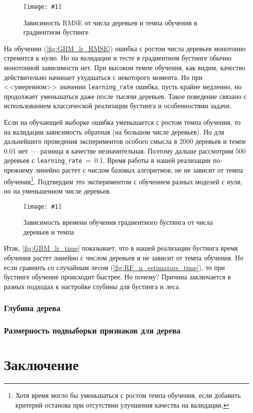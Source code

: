 \documentclass[12pt]{article}
\newcommand{\mpl}[2]{
    \begin{figure}[!h]
        \texttt{[image: \#1]}
        \centering
        \caption{#2}
        \label{fig:#1}
     \end{figure}
}
\begin{document}
\mpl{GBM_lr_RMSE}{Зависимость RMSE от числа деревьев и темпа обучения в градиентном бустинге}

На обучении (\autoref{fig:GBM_lr_RMSE}) ошибка с ростом числа деревьев монотонно стремится к нулю. Но на валидации и тесте в градиентном бустинге обычно монотонной зависимости нет. При высоком темпе обучения, как видим, качество действительно начинает ухудшаться с некоторого момента. Но при <<умеренном>> значении \verb|learning_rate| ошибка, пусть крайне медленно, но продолжает уменьшаться даже после тысячи деревьев. Такое поведение связано с использованием классической реализации бустинга и особенностями задачи. 

Если на обучающей выборке ошибка уменьшается с ростом темпа обучения, то на валидации зависимость обратная (на большом числе деревьев). Но для дальнейшего проведения экспериментов особого смысла в 2000 деревьев и темпе 0.01 нет~--- разница в качестве незначительная. Поэтому дальше рассмотрим 500 деревьев с \verb|learning_rate|~=~0.1. Время работы в нашей реализации по-прежнему линейно растет с числом базовых алгоритмов, не не зависит от темпа обучения\footnote{Хотя время могло бы уменьшаться с ростом темпа обучения, если добавить критерий останова при отсутствии улучшения качества на валидации.}. Подтвердим это экспериментом с обучением разных моделей с нуля, но на уменьшенном числе деревьев.

\mpl{GBM_lr_time}{Зависимость времени обучения градиентного бустинга от числа деревьев и темпа}

Итак, \autoref{fig:GBM_lr_time} показывает, что в нашей реализации бустинга время обучения растет линейно с числом деревьев и не зависит от темпа обучения. Но если сравнить со случайным лесом (\autoref{fig:RF_n_estimators_time}), то при бустинге обучение происходит быстрее. Но почему? Причина заключается в разных подходах к настройке глубины для бустинга и леса.

\subsubsection{Глубина дерева}
\subsubsection{Размерность подвыборки признаков для дерева}
\section{Заключение}
\end{document}
